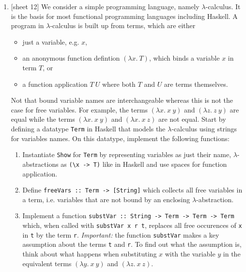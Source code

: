\documentclass{article}
\def\code#1{\texttt{#1}}
\begin{document}
\begin{enumerate}
    \item {[sheet 12]} We consider a simple programming language, namely $\lambda$-calculus. It is the basis for most functional programming languages including Haskell. A program in $\lambda$-calculus is built up from terms, which are either
        \begin{itemize}
            \item just a variable, e.g. $x$,
            \item an anonymous function defintion $(\lambda x.\ T)$, which binds a variable $x$ in term $T$, or
            \item a function application $T\ U$ where both $T$ and $U$ are terms themselves.
        \end{itemize}
        Not that bound variable names are interchangeable whereas this is not the case for free variables. For example, the terms $(\lambda x.\ x\ y)$ and $(\lambda z.\ z\ y)$ are equal while the terms $(\lambda x.\ x\ y)$ and $(\lambda x.\ x\ z)$ are not equal. Start by defining a datatype \code{Term} in Haskell that models the $\lambda$-calculus using strings for variables names. On this datatype, implement the following functions:
        \begin{enumerate}
            \item Instantiate \code{Show} for \code{Term} by representing variables as just their name, $\lambda$-abstractions as \code{(\textbackslash x -> T)} like in Haskell and use spaces for function application.
            \item Define \code{freeVars :: Term -> [String]} which collects all free variables in a term, i.e. variables that are not bound by an enclosing $\lambda$-abstraction.
            \item Implement a function \code{substVar :: String -> Term -> Term -> Term} which, when called with \code{substVar x r t}, replaces all free occurences of \code{x} in \code{t} by the term \code{r}. \textit{Important:} the function \code{substVar} makes a key assumption about the terms \code{t} and \code{r}. To find out what the assumption is, think about what happens when substituting $x$ with the variable $y$ in the equivalent terms $(\lambda y.\ x\ y)$ and $(\lambda z.\ x\ z)$.
        \end{enumerate}


\end{enumerate}
\end{document}
